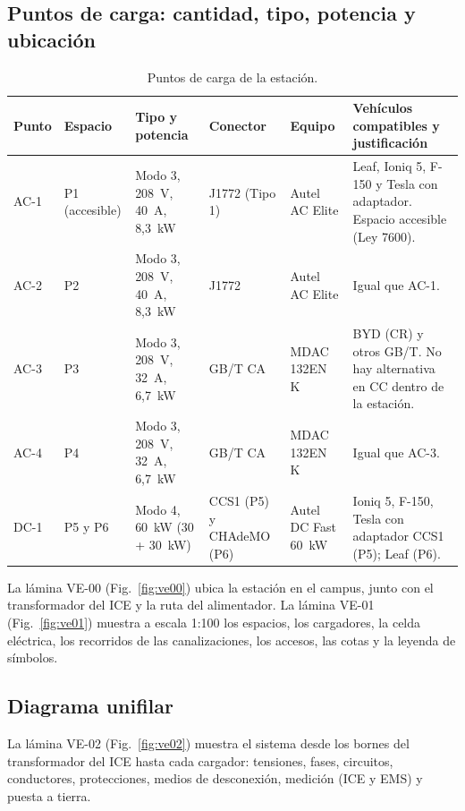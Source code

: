 \subsection{Puntos de carga: cantidad, tipo, potencia y ubicación}
\begin{table}[H]
\centering\small
\caption{Puntos de carga de la estación.}\label{tab:puntos}
\begin{tabularx}{\textwidth}{L{1.3cm}L{1.1cm}L{2.6cm}L{2.2cm}L{2.0cm}Y}
\toprule
\textbf{Punto} & \textbf{Espacio} & \textbf{Tipo y potencia} & \textbf{Conector} & \textbf{Equipo} & \textbf{Vehículos compatibles y justificación}\\
\midrule
AC-1 & P1 (accesible) & Modo 3, 208~V, 40~A, 8,3~kW & J1772 (Tipo 1) & Autel AC Elite & Leaf, Ioniq 5, F-150 y Tesla con adaptador. Espacio accesible (Ley 7600).\\
AC-2 & P2 & Modo 3, 208~V, 40~A, 8,3~kW & J1772 & Autel AC Elite & Igual que AC-1.\\
AC-3 & P3 & Modo 3, 208~V, 32~A, 6,7~kW & GB/T CA & MDAC 132EN K & BYD (CR) y otros GB/T. No hay alternativa en CC dentro de la estación.\\
AC-4 & P4 & Modo 3, 208~V, 32~A, 6,7~kW & GB/T CA & MDAC 132EN K & Igual que AC-3.\\
DC-1 & P5 y P6 & Modo 4, 60~kW (30 + 30~kW) & CCS1 (P5) y CHAdeMO (P6) & Autel DC Fast 60~kW & Ioniq 5, F-150, Tesla con adaptador CCS1 (P5); Leaf (P6).\\
\bottomrule
\end{tabularx}
\end{table}

La lámina VE-00 (Fig.~\ref{fig:ve00}) ubica la estación en el campus, junto con el transformador del ICE y la ruta del alimentador. La lámina VE-01 (Fig.~\ref{fig:ve01}) muestra a escala 1:100 los espacios, los cargadores, la celda eléctrica, los recorridos de las canalizaciones, los accesos, las cotas y la leyenda de símbolos.


\subsection{Diagrama unifilar}
La lámina VE-02 (Fig.~\ref{fig:ve02}) muestra el sistema desde los bornes del transformador del ICE hasta cada cargador: tensiones, fases, circuitos, conductores, protecciones, medios de desconexión, medición (ICE y EMS) y puesta a tierra.

